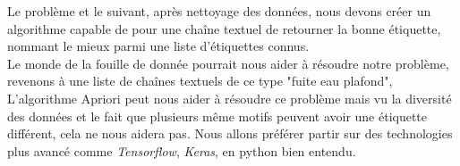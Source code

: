 Le problème et le suivant, après nettoyage des données, nous devons créer un algorithme capable de pour une chaîne textuel de retourner la bonne étiquette, nommant le mieux parmi une liste d'étiquettes connus.\\
Le monde de la fouille de donnée pourrait nous aider à résoudre notre problème, revenons à une liste de chaînes textuels de ce type "fuite eau plafond", L'algorithme Apriori peut nous aider à résoudre ce problème mais vu la diversité des données et le fait que plusieurs même motifs peuvent avoir une étiquette différent, cela ne nous aidera pas. Nous allons préférer partir sur des technologies plus avancé comme \textit{Tensorflow}, \textit{Keras}, en python bien entendu.

